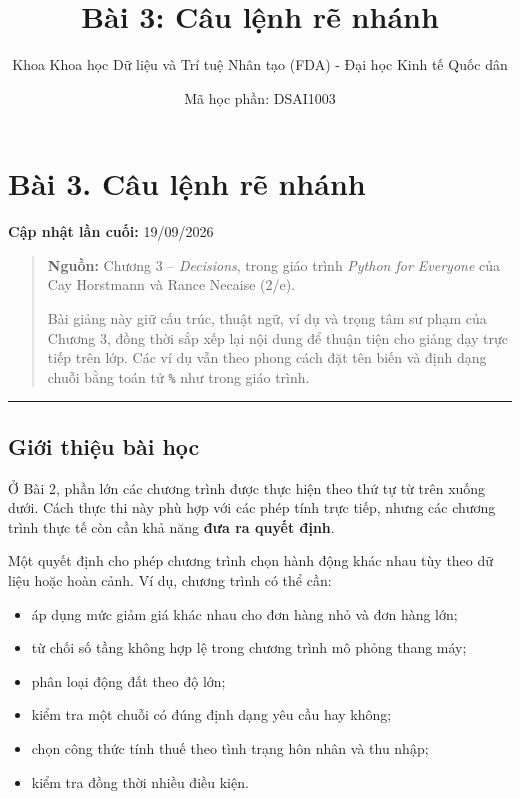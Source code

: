 \documentclass[
  11pt,
  a4paper,
]{article}
\title{Bài 3: Câu lệnh rẽ nhánh}
\author{Khoa Khoa học Dữ liệu và Trí tuệ Nhân tạo (FDA) - Đại học Kinh tế Quốc dân}
\date{Mã học phần: DSAI1003}
\providecommand{\tightlist}{%
  \setlength{\itemsep}{0pt}\setlength{\parskip}{0pt}}
\begin{document}
\maketitle

{
\setcounter{tocdepth}{3}
\tableofcontents
}
\section{Bài 3. Câu lệnh rẽ
nhánh}\label{buxe0i-3.-cuxe2u-lux1ec7nh-rux1ebd-nhuxe1nh}

\textbf{Cập nhật lần cuối:} 19/09/2026

\begin{quote}
\textbf{Nguồn:} Chương 3 -- \emph{Decisions}, trong giáo trình
\emph{Python for Everyone} của Cay Horstmann và Rance Necaise (2/e).

Bài giảng này giữ cấu trúc, thuật ngữ, ví dụ và trọng tâm sư phạm của
Chương 3, đồng thời sắp xếp lại nội dung để thuận tiện cho giảng dạy
trực tiếp trên lớp. Các ví dụ vẫn theo phong cách đặt tên biến và định
dạng chuỗi bằng toán tử \texttt{\%} như trong giáo trình.
\end{quote}

\begin{center}\rule{0.5\linewidth}{0.5pt}\end{center}

\subsection{Giới thiệu bài
học}\label{giux1edbi-thiux1ec7u-buxe0i-hux1ecdc}

Ở Bài 2, phần lớn các chương trình được thực hiện theo thứ tự từ trên
xuống dưới. Cách thực thi này phù hợp với các phép tính trực tiếp, nhưng
các chương trình thực tế còn cần khả năng \textbf{đưa ra quyết định}.

Một quyết định cho phép chương trình chọn hành động khác nhau tùy theo
dữ liệu hoặc hoàn cảnh. Ví dụ, chương trình có thể cần:

\begin{itemize}
\tightlist
\item
  áp dụng mức giảm giá khác nhau cho đơn hàng nhỏ và đơn hàng lớn;
\item
  từ chối số tầng không hợp lệ trong chương trình mô phỏng thang máy;
\item
  phân loại động đất theo độ lớn;
\item
  kiểm tra một chuỗi có đúng định dạng yêu cầu hay không;
\item
  chọn công thức tính thuế theo tình trạng hôn nhân và thu nhập;
\item
  kiểm tra đồng thời nhiều điều kiện.
\end{itemize}
\end{document}
